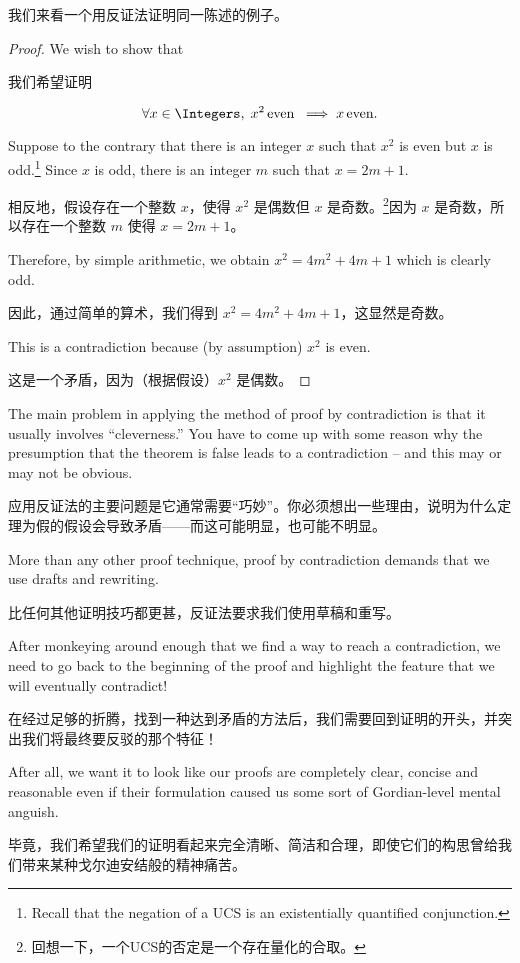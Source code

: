 我们来看一个用反证法证明同一陈述的例子。
\begin{proof}
We wish to show that 

我们希望证明

\[ \forall x \in \Integers, \; x^2 \, \mbox{even} \; 
\implies x \, \mbox{even}.
\]

Suppose to the contrary that there is an integer $x$ such that 
$x^2$ is even but $x$ is odd.\footnote{Recall that the negation of 
a UCS is an existentially quantified conjunction.}  Since $x$ is
odd, there is an integer $m$ such that $x=2m+1$.

相反地，假设存在一个整数 $x$，使得 $x^2$ 是偶数但 $x$ 是奇数。\footnote{回想一下，一个UCS的否定是一个存在量化的合取。}因为 $x$ 是奇数，所以存在一个整数 $m$ 使得 $x=2m+1$。

Therefore, by
simple arithmetic, we obtain $x^2 = 4m^2+4m+1$ which is clearly odd.

因此，通过简单的算术，我们得到 $x^2 = 4m^2+4m+1$，这显然是奇数。

This is a contradiction because (by assumption) $x^2$ is even.

这是一个矛盾，因为（根据假设）$x^2$ 是偶数。
\end{proof}

The main problem in applying the method of proof by contradiction
is that it usually involves ``cleverness.''   You have to come up
with some reason why the presumption that the theorem is false leads
to a contradiction -- and this may or may not be obvious.

应用反证法的主要问题是它通常需要“巧妙”。你必须想出一些理由，说明为什么定理为假的假设会导致矛盾——而这可能明显，也可能不明显。

More than
any other proof technique, proof by contradiction demands that we use
drafts and rewriting.

比任何其他证明技巧都更甚，反证法要求我们使用草稿和重写。

After monkeying around enough that we find a 
way to reach a contradiction, we need to go back to the beginning
of the proof and highlight the feature that we will eventually contradict!

在经过足够的折腾，找到一种达到矛盾的方法后，我们需要回到证明的开头，并突出我们将最终要反驳的那个特征！

After all, we want it to look like our proofs are completely clear, concise
and reasonable even if their formulation caused us some sort
of Gordian-level mental anguish.

毕竟，我们希望我们的证明看起来完全清晰、简洁和合理，即使它们的构思曾给我们带来某种戈尔迪安结般的精神痛苦。


